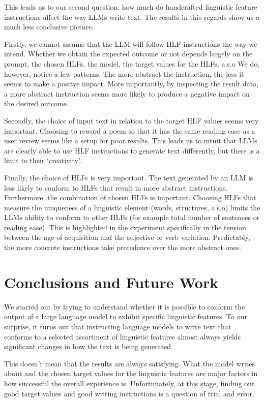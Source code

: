 \documentclass[runningheads,a4paper,11pt]{article}
\begin{document}
This leads us to our second question: how much do handcrafted linguistic feature
instructions affect the way LLMs write text.
The results in this regards show us a much less conclusive picture.

Firstly, we cannot assume that the LLM will follow HLF instructions the way we
intend.
Whether we obtain the expected outcome or not depends largely on the prompt,
the chosen HLFs, the model, the target values for the HLFs, a.s.o
We do, however, notice a few patterns.
The more abstract the instruction, the less it seems to make a positve impact.
More importantly, by inspecting the result data, a more abstract instruction
seems more likely to produce a negative impact on the desired outcome.

Secondly, the choice of input text in relation to the target HLF values seems
very important.
Choosing to reword a poem so that it has the same reading ease as a user review
seems like a setup for poor results.
This leads us to intuit that LLMs are clearly able to use HLF instructions to
generate text differently, but there is a limit to their `creativity'.

Finally, the choice of HLFs is very important.
The text generated by an LLM is less likely to conform to HLFs that result in
more abstract instructions.
Furthermore, the combination of chosen HLFs is important.
Choosing HLFs that measure the uniqueness of a linguistic element (words,
structures, a.s.o) limits the LLMs ability to conform to other HLFs (for example
total number of sentences or reading ease).
This is highlighted in the experiment specifically in the tension between the
age of acquisition and the adjective or verb variation.
Predictably, the more concrete instructions take precedence over the more
abstract ones.

\section{Conclusions and Future Work}

We started out by trying to understand whether it is possible to conform the
output of a large language model to exhibit specific linguistic features.
To our surprise, it turns out that instructing language models to write text
that conforms to a selected assortment of linguistic features almost always
yields significant changes in how the text is being generated.

This doesn't mean that the results are always satisfying.
What the model writes about and the chosen target values for the linguistic
features are major factors in how successful the overall experience is.
Unfortunately, at this stage, finding out good target values and good writing
instructions is a question of trial and error.
\end{document}
